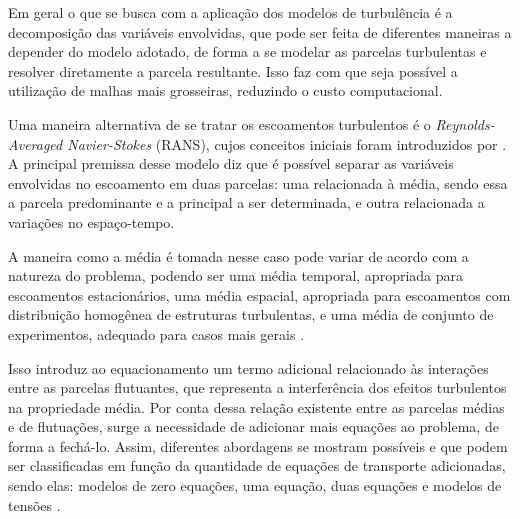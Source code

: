 Em geral o que se busca com a aplicação dos modelos de turbulência é a decomposição das variáveis envolvidas, que pode ser feita de diferentes maneiras a depender do modelo adotado, de forma a se modelar as parcelas turbulentas e resolver diretamente a parcela resultante. Isso faz com que seja possível a utilização de malhas mais grosseiras, reduzindo o custo computacional.

 \label{RANS}

Uma maneira alternativa de se tratar os escoamentos turbulentos é o \textit{Reynolds-Averaged Navier-Stokes} (RANS), cujos conceitos iniciais foram introduzidos por . A principal premissa desse modelo diz que é possível separar as variáveis envolvidas no escoamento em duas parcelas: uma relacionada à média, sendo essa a parcela predominante e a principal a ser determinada, e outra relacionada a variações no espaço-tempo.

A maneira como a média é tomada nesse caso pode variar de acordo com a natureza do problema, podendo ser uma média temporal, apropriada para escoamentos estacionários, uma média espacial, apropriada para escoamentos com distribuição homogênea de estruturas turbulentas, e uma média de conjunto de experimentos, adequado para casos mais gerais \cite{speziale1991analytical,alfonsi2009reynolds}.

Isso introduz ao equacionamento um termo adicional relacionado às interações entre as parcelas flutuantes, que representa a interferência dos efeitos turbulentos na propriedade média. Por conta dessa relação existente entre as parcelas médias e de flutuações, surge a necessidade de adicionar mais equações ao problema, de forma a fechá-lo. Assim, diferentes abordagens se mostram possíveis e que podem ser classificadas em função da quantidade de equações de transporte adicionadas, sendo elas: modelos de zero equações, uma equação, duas equações e modelos de tensões \cite{piomelli1999large,alfonsi2009reynolds,bazilevs2010large,ling2015evaluation}.

 \label{LES}

